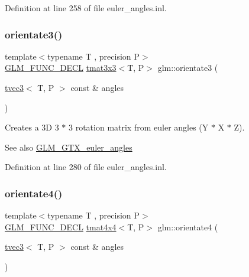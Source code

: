Definition at line 258 of file euler\+\_\+angles.\+inl.

\mbox{\label{group__gtx__euler__angles_ga33f0d790cecd8337ee83f8e3a8109b11}} 
\subsubsection{\texorpdfstring{orientate3()}{orientate3()}\hspace{0.1cm}{\footnotesize\ttfamily [2/2]}}
{\footnotesize\ttfamily template$<$typename T , precision P$>$ \\
\mbox{\hyperlink{setup_8hpp_ab2d052de21a70539923e9bcbf6e83a51}{G\+L\+M\+\_\+\+F\+U\+N\+C\+\_\+\+D\+E\+CL}} \mbox{\hyperlink{structglm_1_1tmat3x3}{tmat3x3}}$<$T, P$>$ glm\+::orientate3 (\begin{DoxyParamCaption}\item[{\mbox{\hyperlink{structglm_1_1tvec3}{tvec3}}$<$ T, P $>$ const \&}]{angles }\end{DoxyParamCaption})}

Creates a 3D 3 $\ast$ 3 rotation matrix from euler angles (Y $\ast$ X $\ast$ Z). \begin{DoxySeeAlso}{See also}
\mbox{\hyperlink{group__gtx__euler__angles}{G\+L\+M\+\_\+\+G\+T\+X\+\_\+euler\+\_\+angles}} 
\end{DoxySeeAlso}


Definition at line 280 of file euler\+\_\+angles.\+inl.

\mbox{\label{group__gtx__euler__angles_ga4e25c9468b6f002c76e9a2412bcfa503}} 
\subsubsection{\texorpdfstring{orientate4()}{orientate4()}}
{\footnotesize\ttfamily template$<$typename T , precision P$>$ \\
\mbox{\hyperlink{setup_8hpp_ab2d052de21a70539923e9bcbf6e83a51}{G\+L\+M\+\_\+\+F\+U\+N\+C\+\_\+\+D\+E\+CL}} \mbox{\hyperlink{structglm_1_1tmat4x4}{tmat4x4}}$<$T, P$>$ glm\+::orientate4 (\begin{DoxyParamCaption}\item[{\mbox{\hyperlink{structglm_1_1tvec3}{tvec3}}$<$ T, P $>$ const \&}]{angles }\end{DoxyParamCaption})}

